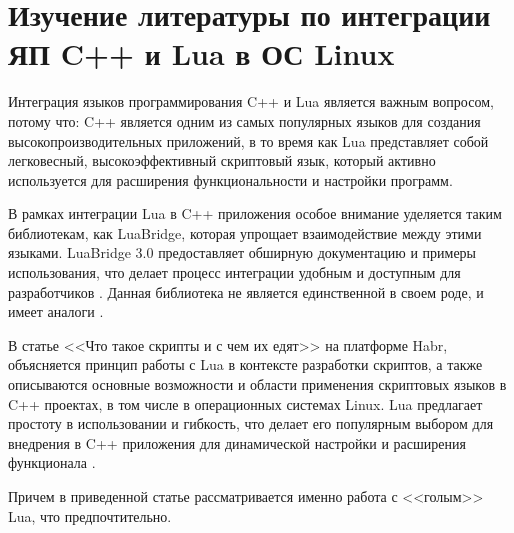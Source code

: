 \section{Изучение литературы по интеграции ЯП C++ и Lua в ОС Linux}
Интеграция языков программирования C++ и Lua является важным вопросом, потому что: C++ является одним из самых популярных языков для создания высокопроизводительных приложений, в то время как Lua представляет собой легковесный, высокоэффективный скриптовый язык, который активно используется для расширения функциональности и настройки программ.

В рамках интеграции Lua в C++ приложения особое внимание уделяется таким библиотекам, как LuaBridge, которая упрощает взаимодействие между этими языками. LuaBridge 3.0 предоставляет обширную документацию и примеры использования, что делает процесс интеграции удобным и доступным для разработчиков \cite{lua_c2}. Данная библиотека не является единственной в своем роде, и имеет аналоги \cite{lua_c3}.

В статье <<Что такое скрипты и с чем их едят>> на платформе Habr, объясняется принцип работы с Lua в контексте разработки скриптов, а также описываются основные возможности и области применения скриптовых языков в C++ проектах, в том числе в операционных системах Linux. Lua предлагает простоту в использовании и гибкость, что делает его популярным выбором для внедрения в C++ приложения для динамической настройки и расширения функционала \cite{lua_c1}.

Причем в приведенной статье рассматривается именно работа с <<голым>> Lua, что предпочтительно.
\clearpage